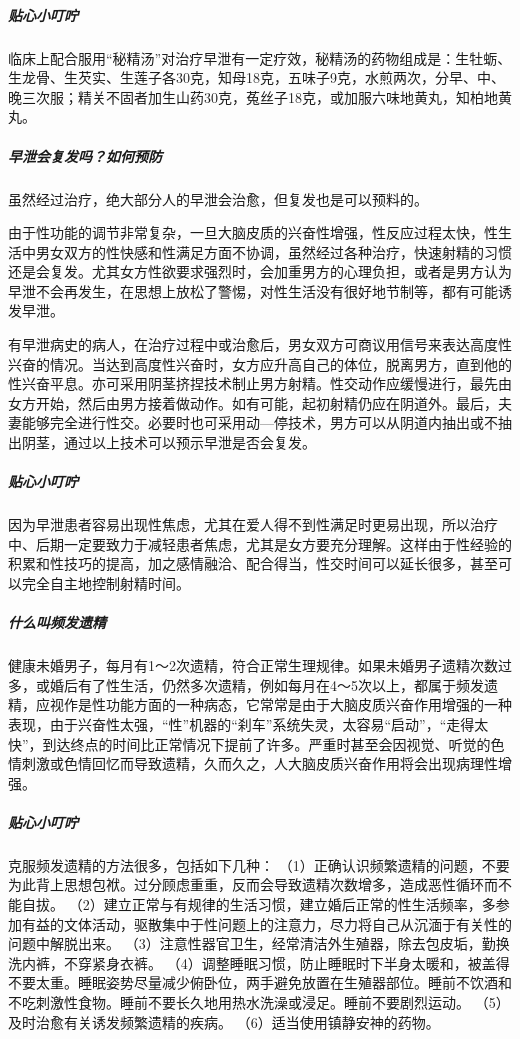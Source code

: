 \begin{enumerate}
\subparagraph{贴心小叮咛}

临床上配合服用“秘精汤”对治疗早泄有一定疗效，秘精汤的药物组成是：生牡蛎、生龙骨、生芡实、生莲子各30克，知母18克，五味子9克，水煎两次，分早、中、晚三次服；精关不固者加生山药30克，菟丝子18克，或加服六味地黄丸，知柏地黄丸。

\subparagraph{早泄会复发吗？如何预防}

虽然经过治疗，绝大部分人的早泄会治愈，但复发也是可以预料的。

由于性功能的调节非常复杂，一旦大脑皮质的兴奋性增强，性反应过程太快，性生活中男女双方的性快感和性满足方面不协调，虽然经过各种治疗，快速射精的习惯还是会复发。尤其女方性欲要求强烈时，会加重男方的心理负担，或者是男方认为早泄不会再发生，在思想上放松了警惕，对性生活没有很好地节制等，都有可能诱发早泄。

有早泄病史的病人，在治疗过程中或治愈后，男女双方可商议用信号来表达高度性兴奋的情况。当达到高度性兴奋时，女方应升高自己的体位，脱离男方，直到他的性兴奋平息。亦可采用阴茎挤捏技术制止男方射精。性交动作应缓慢进行，最先由女方开始，然后由男方接着做动作。如有可能，起初射精仍应在阴道外。最后，夫妻能够完全进行性交。必要时也可采用动—停技术，男方可以从阴道内抽出或不抽出阴茎，通过以上技术可以预示早泄是否会复发。

\subparagraph{贴心小叮咛}

因为早泄患者容易出现性焦虑，尤其在爱人得不到性满足时更易出现，所以治疗中、后期一定要致力于减轻患者焦虑，尤其是女方要充分理解。这样由于性经验的积累和性技巧的提高，加之感情融洽、配合得当，性交时间可以延长很多，甚至可以完全自主地控制射精时间。

\subparagraph{什么叫频发遗精}

健康未婚男子，每月有1～2次遗精，符合正常生理规律。如果未婚男子遗精次数过多，或婚后有了性生活，仍然多次遗精，例如每月在4～5次以上，都属于频发遗精，应视作是性功能方面的一种病态，它常常是由于大脑皮质兴奋作用增强的一种表现，由于兴奋性太强，“性”机器的“刹车”系统失灵，太容易“启动”，“走得太快”，到达终点的时间比正常情况下提前了许多。严重时甚至会因视觉、听觉的色情刺激或色情回忆而导致遗精，久而久之，人大脑皮质兴奋作用将会出现病理性增强。

\subparagraph{贴心小叮咛}

克服频发遗精的方法很多，包括如下几种：
（1）正确认识频繁遗精的问题，不要为此背上思想包袱。过分顾虑重重，反而会导致遗精次数增多，造成恶性循环而不能自拔。
（2）建立正常与有规律的生活习惯，建立婚后正常的性生活频率，多参加有益的文体活动，驱散集中于性问题上的注意力，尽力将自己从沉湎于有关性的问题中解脱出来。
（3）注意性器官卫生，经常清洁外生殖器，除去包皮垢，勤换洗内裤，不穿紧身衣裤。
（4）调整睡眠习惯，防止睡眠时下半身太暖和，被盖得不要太重。睡眠姿势尽量减少俯卧位，两手避免放置在生殖器部位。睡前不饮酒和不吃刺激性食物。睡前不要长久地用热水洗澡或浸足。睡前不要剧烈运动。
（5）及时治愈有关诱发频繁遗精的疾病。
（6）适当使用镇静安神的药物。


\end{enumerate}
